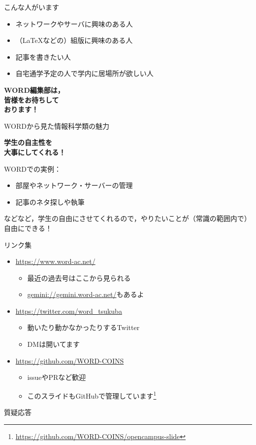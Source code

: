 \documentclass[lualatex]{beamer}
\begin{document}
\begin{frame}[plain]{こんな人がいます}
 \begin{itemize}
  \item ネットワークやサーバに興味のある人
  \item （\LaTeX などの）組版に興味のある人
  \item 記事を書きたい人
  \item 自宅通学予定の人で学内に居場所が欲しい人
 \end{itemize}
\end{frame}
\begin{frame}[plain]
 \begin{center}
  \Huge\textbf{WORD編集部は，\\皆様をお待ちして\\おります！}
 \end{center}
\end{frame}
\begin{frame}[plain]{WORDから見た情報科学類の魅力}
\pause
 \begin{center}
  \Huge \alert{\textbf{学生の自主性を\\大事にしてくれる！}}
 \end{center}
\pause
WORDでの実例：
\begin{itemize}
 \item 部屋やネットワーク・サーバーの管理
 \item 記事のネタ探しや執筆
\end{itemize}
などなど，学生の自由にさせてくれるので，やりたいことが（常識の範囲内で）自由にできる！
\end{frame}
\begin{frame}[plain]{リンク集}
 \begin{itemize}
  \item \url{https://www.word-ac.net/}
  \begin{itemize}
   \item 最近の過去号はここから見られる
   \item \url{gemini://gemini.word-ac.net/}もあるよ
  \end{itemize}
  \item \url{https://twitter.com/word\_tsukuba}
  \begin{itemize}
   \item 動いたり動かなかったりするTwitter
   \item DMは開いてます
  \end{itemize}
  \item \url{https://github.com/WORD-COINS}
  \begin{itemize}
   \item issueやPRなど歓迎
   \item このスライドもGitHubで管理しています\footnote{\url{https://github.com/WORD-COINS/opencampus-slide}}
  \end{itemize}
 \end{itemize}
\end{frame}
\begin{frame}[plain]
 \begin{center}
  質疑応答
 \end{center}
\end{frame}
\end{document}
